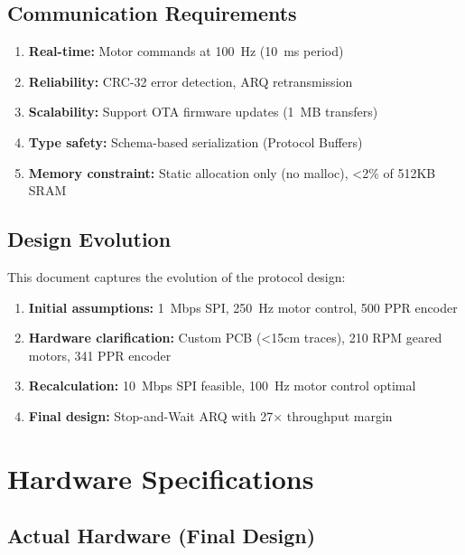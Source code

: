 \documentclass[12pt,letterpaper]{article}
\begin{document}
\subsection{Communication Requirements}

\begin{enumerate}
    \item \textbf{Real-time:} Motor commands at 100~Hz (10~ms period)
    \item \textbf{Reliability:} CRC-32 error detection, ARQ retransmission
    \item \textbf{Scalability:} Support OTA firmware updates (1~MB transfers)
    \item \textbf{Type safety:} Schema-based serialization (Protocol Buffers)
    \item \textbf{Memory constraint:} Static allocation only (no malloc), <2\% of 512KB SRAM
\end{enumerate}

\subsection{Design Evolution}

This document captures the evolution of the protocol design:
\begin{enumerate}
    \item \textbf{Initial assumptions:} 1~Mbps SPI, 250~Hz motor control, 500 PPR encoder
    \item \textbf{Hardware clarification:} Custom PCB (<15cm traces), 210 RPM geared motors, 341 PPR encoder
    \item \textbf{Recalculation:} 10~Mbps SPI feasible, 100~Hz motor control optimal
    \item \textbf{Final design:} Stop-and-Wait ARQ with 27× throughput margin
\end{enumerate}

\section{Hardware Specifications}

\subsection{Actual Hardware (Final Design)}
\end{document}

